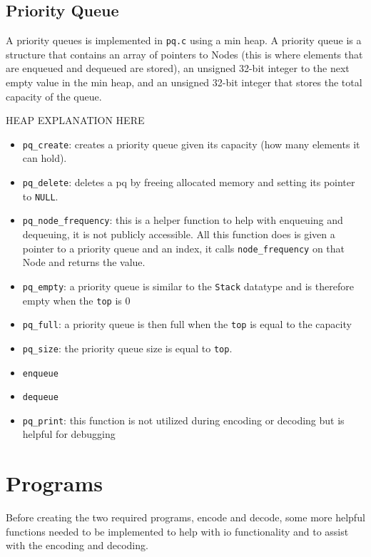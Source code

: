 \documentclass[12pt]{article}
\def\code#1{\texttt{#1}} %
\begin{document}
\subsection{Priority Queue}

A priority queues is implemented in \code{pq.c} using a min heap. A priority queue
is a structure that contains an array of pointers to Nodes (this is where elements
that are enqueued and dequeued are stored), an unsigned 32-bit integer to the next
empty value in the min heap, and an unsigned 32-bit integer that stores the total
capacity of the queue.

HEAP EXPLANATION HERE

\begin{itemize}
	\item{\code{pq\_create}: creates a priority queue given its capacity (how many elements it can
		hold).}
	\item{\code{pq\_delete}: deletes a pq by freeing allocated memory and setting its 
		pointer to \code{NULL}.}
	\item{\code{pq\_node\_frequency}: this is a helper function to help with enqueuing
			and dequeuing, it is not publicly accessible. All this function does is given a pointer
			to a priority queue and an index, it calls \code{node\_frequency} on that Node and returns
		the value.}
	\item{\code{pq\_empty}: a priority queue is similar to the \code{Stack} datatype and is
		therefore empty when the \code{top} is 0}
	\item{\code{pq\_full}: a priority queue is then full when the \code{top} is equal to the capacity}
	\item{\code{pq\_size}: the priority queue size is equal to \code{top}.}
	\item{\code{enqueue} }
	\item{\code{dequeue} }
	\item{\code{pq\_print}: this function is not utilized during encoding or decoding
		but is helpful for debugging}
\end{itemize}

\section{Programs}

Before creating the two required programs, encode and decode, some more helpful
functions needed to be implemented to help with io functionality and to assist
with the encoding and decoding.
\end{document}
